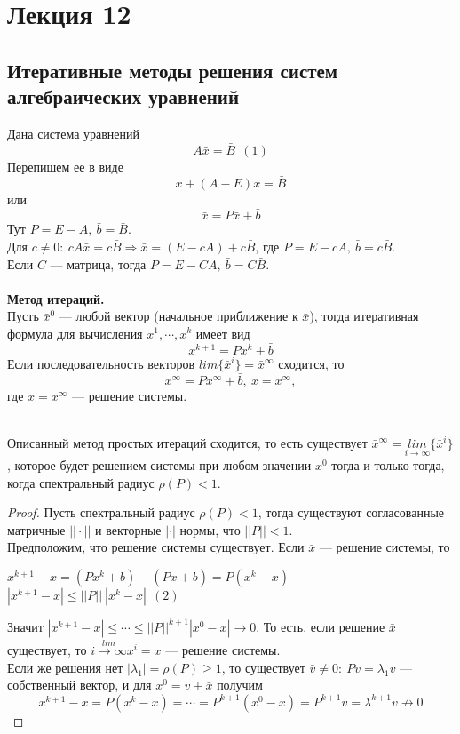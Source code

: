 \newpage
\section{Лекция 12}
\subsection{Итеративные методы решения систем алгебраических уравнений}
Дана система уравнений $$A\bar x=\bar B~~(1)$$
Перепишем ее в виде $$\bar x+(A-E)\bar x=\bar B$$
или $$\bar x=P\bar x+\bar b$$
Тут $P=E-A,~\bar b=\bar B$.\\
Для $c\neq 0:~cA\bar x=c\bar B \Rightarrow \bar x=(E-cA)+c\bar B$, где $P=E-cA,~\bar b=c\bar B$.\\
Если $C$ --- матрица, тогда $P=E-CA,~\bar b=C\bar B$.\\ \\
\textbf{Метод итераций.}\\
Пусть $\bar x^0$ --- любой вектор (начальное приближение к $\bar x$), тогда итеративная формула для вычисления $\bar x^1, \cdots, \bar x^k$ имеет вид
$$x^{k+1}=Px^k+\bar b$$ 
Если последовательность векторов $lim\{\bar x^i\}=\bar x^{\infty}$ сходится, то $$x^{\infty}=Px^{\infty}+\bar b,~x=x^{\infty},$$
где $x=x^{\infty}$ --- решение системы.\\
\\
\begin{theorem}
    Описанный метод простых итераций сходится, то есть существует $\bar x^{\infty}=\underset{i\to \infty}{lim}\{\bar x^i\}$, которое будет решением системы при любом значении $x^0$ тогда и только тогда, когда спектральный радиус $\rho(P)<1$.
\end{theorem}
\begin{proof}
    Пусть спектральный радиус $\rho(P)<1$, тогда существуют согласованные матричные $||\cdot||$ и векторные $|\cdot|$ нормы, что $||P||<1$.\\
Предположим, что решение системы существует. Если $\bar x$ --- решение системы, то \begin{center}
    $x^{k+1}-x=(Px^k+\bar b)-(Px+\bar b)=P(x^k-x)$\\
    $|x^{k+1}-x|\leqslant||P||~|x^k-x|~~(2)$
\end{center}
Значит $|x^{k+1}-x|\leqslant \cdots \leqslant ||P||^{k+1}|x^0-x| \to 0$. То есть, если решение $\bar x$ существует, то $\overset{lim}{i\to \infty}x^i=x$ --- решение системы.\\
Если же решения нет $|\lambda_1|=\rho(P)\geqslant 1$, то существует $\bar v\neq 0:~Pv=\lambda_1 v$ --- собственный вектор, и для $x^0=v+\bar x$ получим
$$x^{k+1}-x=P(x^k-x)=\cdots=P^{k+1}(x^0-x)=P^{k+1}v=\lambda^{k+1}v \nrightarrow 0$$
\end{proof}

